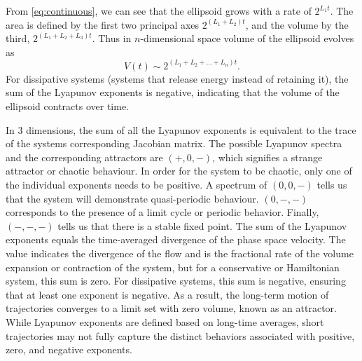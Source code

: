 From \eqref{eq:continuous}, we can see that the ellipsoid grows with a rate of $2^{L_1t}$. The area is defined by the first two principal axes $2^{(L_1+L_2)t}$, and the volume by the third, $2^{(L_1+L_2+L_3)t}$. Thus in $n$-dimensional space volume of the ellipsoid evolves as
$$
V(t) \sim 2^{(L_1 + L_2 + \dots + L_n)t}.
$$
For dissipative systems (systems that release energy instead of retaining it), the sum of the Lyapunov exponents is negative, indicating that the volume of the ellipsoid contracts over time.

In 3 dimensions, the sum of all the Lyapunov exponents is equivalent to the trace of the systems corresponding Jacobian matrix. 
The possible Lyapunov spectra and the corresponding attractors are $(+,0,-)$, which signifies a strange attractor or chaotic behaviour. 
In order for the system to be chaotic, only one of the individual exponents needs to be positive. 
A spectrum of $(0,0,-)$ tells us that the system will demonstrate quasi-periodic behaviour. 
$(0,-,-)$ corresponds to the presence of a limit cycle or periodic behavior. 
Finally, $(-,-,-)$ tells us that there is a stable fixed point. 
The sum of the Lyapunov exponents equals the time-averaged divergence of the phase space velocity. 
The value indicates the divergence of the flow and is the fractional rate of the volume expansion or contraction of the system, but for a conservative or Hamiltonian system, this sum is zero. 
For dissipative systems, this sum is negative, ensuring that at least one exponent is negative. 
As a result, the long-term motion of trajectories converges to a limit set with zero volume, known as an attractor. 
While Lyapunov exponents are defined based on long-time averages, short trajectories may not fully capture the distinct behaviors associated with positive, zero, and negative exponents.



